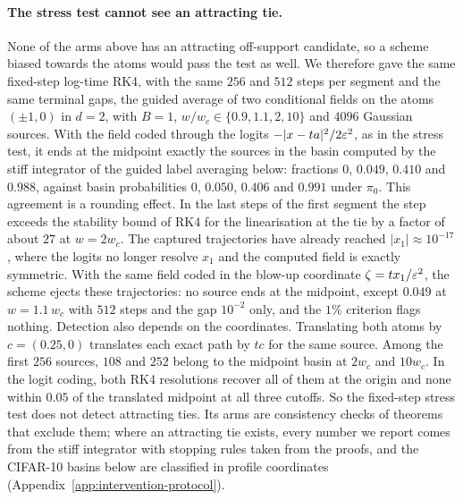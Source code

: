 \documentclass{article} %
\theoremstyle{plain}
\theoremstyle{definition}
\theoremstyle{remark}
\begin{document}
\paragraph{The stress test cannot see an attracting tie.} None of the arms above has an attracting
off-support candidate, so a scheme biased towards the atoms would pass the test as well. We therefore
gave the same fixed-step log-time RK4, with the same $256$ and $512$ steps per segment and the
same terminal gaps, the guided average of two conditional fields on the atoms $(\pm1,0)$ in $d=2$,
with $B=1$, $w/w_c\in\{0.9,1.1,2,10\}$ and $4096$ Gaussian sources. With the field coded through
the logits $-|x-ta|^2/2\varepsilon^2$, as in the stress test, it ends at the midpoint exactly the sources
in the basin computed by the stiff integrator of the guided label averaging below: fractions $0$, $0.049$, $0.410$ and $0.988$,
against basin probabilities $0$, $0.050$, $0.406$ and $0.991$ under $\pi_0$. This agreement is a
rounding effect. In the last steps of the first segment the step exceeds the stability bound of
RK4 for the linearisation at the tie by a factor of about $27$ at $w=2w_c$. The captured trajectories have
already reached $|x_1|\approx10^{-17}$, where the logits no longer resolve $x_1$ and the computed
field is exactly symmetric. With the same field coded in the blow-up coordinate $\zeta=tx_1/\varepsilon^2$,
the scheme ejects these trajectories: no source ends at the midpoint, except $0.049$ at
$w=1.1\,w_c$ with $512$ steps and the gap $10^{-2}$ only, and the $1\%$ criterion flags nothing.
Detection also depends on the coordinates. Translating both atoms by $c=(0.25,0)$ translates each
exact path by $tc$ for the same source. Among the first $256$ sources, $108$ and $252$ belong to
the midpoint basin at $2w_c$ and $10w_c$. In the logit coding, both RK4 resolutions recover all of
them at the origin and none within $0.05$ of the translated midpoint at all three cutoffs. So the
fixed-step stress test does not detect attracting ties. Its arms are consistency checks of
theorems that exclude them; where an attracting tie exists, every number we report comes from the
stiff integrator with stopping rules taken from the proofs, and the CIFAR-10 basins below are
classified in profile coordinates (Appendix~\ref{app:intervention-protocol}).
\end{document}
